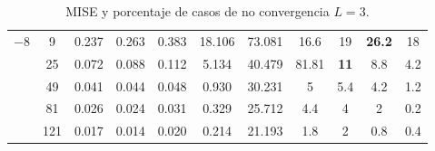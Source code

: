 \begin{table}[hbt]
\begin{tabular}{cc|SSSSS|SSSS}
		\cmidrule(r){1-7}
		\cmidrule(r){8-11}										
		&   9    	&  	  0.237  	&	  0.263  	&	  0.383  	&	  18.106  	&	  73.081  	&	 16.6 	&	 19 		&  \textbf{26.2}  &	 18  \\
		&   25   	&  	  0.072  	&	  0.088  	&	  0.112  	&	  5.134   	&	  40.479  	&	 81.81 	&    \textbf{11}&	 8.8 		&	 4.2  \\
		&   49   	&  	  0.041  	&	  0.044  	&	  0.048  	&	  0.930   	&	  30.231  	&	 5 	    &	 5.4 		&	 4.2 		&	 1.2  \\
		&   81   	&  	  0.026  	&	  0.024  	&	  0.031  	&	  0.329   	&	  25.712  	&	 4.4 	&	 4 		    &	 2 		    &	 0.2  \\
		&   121  	&  	  0.017  	&	  0.014  	&	  0.020  	&	  0.214   	&	  21.193  	&	 1.8  	&	 2 		    &	 0.8 		&	 0.4  \\
		\bottomrule
	\end{tabular}										
\caption{\label{MiseyCantCasosNoConvergenciaL=3} MISE y porcentaje de casos de no convergencia $L=3$.}									
\end{table}	

